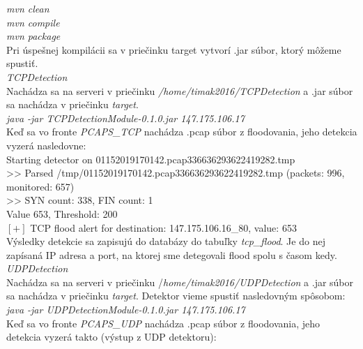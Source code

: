 \documentclass[a4paper,12pt]{article}
\begin{document}
\noindent \textit{mvn clean \\
mvn compile \\
mvn package} \\

Pri úspešnej kompilácii sa v priečinku target vytvorí .jar súbor, ktorý môžeme spustiť. \\

\noindent \textit{TCPDetection} \\

Nachádza sa na serveri v priečinku \textit{/home/timak2016/TCPDetection} a .jar súbor sa nachádza v priečinku \textit{target}. \\

\noindent \textit{java -jar TCPDetectionModule-0.1.0.jar 147.175.106.17} \\

Keď sa vo fronte \textit{PCAPS\_TCP} nachádza .pcap súbor z floodovania, jeho detekcia vyzerá nasledovne: \\

\noindent [TCPDetection] Starting detector on 01152019170142.pcap336636293622419282.tmp \\
>> Parsed /tmp/01152019170142.pcap336636293622419282.tmp (packets: 996, monitored: 657) \\
>> SYN count: 338, FIN count: 1 \\
Value 653, Threshold: 200 \\
$[+]$ TCP flood alert for destination: 147.175.106.16\_80, value: 653 \\

Výsledky detekcie sa zapisujú do databázy do tabuľky \textit{tcp\_flood}. Je do nej zapísaná IP adresa a port, na ktorej sme detegovali flood spolu s časom kedy. \\

\noindent \textit{UDPDetection} \\

Nachádza sa na serveri v priečinku /\textit{home/timak2016/UDPDetection} a .jar súbor sa nachádza v priečinku \textit{target}. Detektor vieme spustiť nasledovným spôsobom: \\

\noindent \textit{java -jar UDPDetectionModule-0.1.0.jar 147.175.106.17} \\

Keď sa vo fronte \textit{PCAPS\_UDP} nachádza .pcap súbor z floodovania, jeho detekcia vyzerá takto (výstup z UDP detektoru): \\
\end{document}
